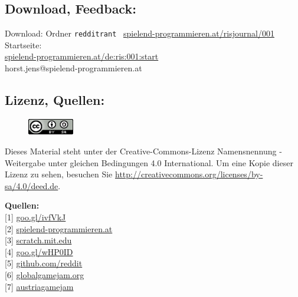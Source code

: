 \subsection*{Download, Feedback:}
\footnotesize{
Download: Ordner \texttt{redditrant} \Mundus\ \href{http://spielend-programmieren.at/risjournal/001}{spielend-programmieren.at/risjournal/001}\\
Startseite:\\
\href{http://spielend-programmieren.at/de:ris:001:start}{spielend-programmieren.at/de:ris:001:start}\\ 
\Letter\: horst.jens@spielend-programmieren.at\\}
\normalsize 


\subsection*{Lizenz, Quellen:}
\begin{figure}
\includegraphics[width=2cm]{redditrant/ccbysa88x31.png} 
\end{figure}
Dieses Material steht unter der Creative-Commons-Lizenz Namensnennung - Weitergabe unter gleichen Bedingungen 4.0 International. Um eine Kopie dieser Lizenz zu sehen, besuchen Sie \url{http://creativecommons.org/licenses/by-sa/4.0/deed.de}.

\textbf{Quellen:} \\
{[}1{]} \href{http://www.reddit.com/r/gamedev/comments/z83h2/the_games_industry_is_a_scam_and_this_is_why_you}{goo.gl/ivfVkJ} \\
{[}2{]} \href{http://spielend-programmieren.at}{spielend-programmieren.at} \\
{[}3{]} \href{http://scratch.mit.edu/}{scratch.mit.edu} \\
{[}4{]} \href{http://spielend-programmieren.at/de:mailinglist}{goo.gl/wHP0ID} \\
{[}5{]} \href{http://github.com/reddit/}{github.com/reddit} \\
{[}6{]} \href{http://globalgamejam.org/}{globalgamejam.org} \\
{[}7{]} \href{http://austriagamejam.org/}{austriagamejam} 

